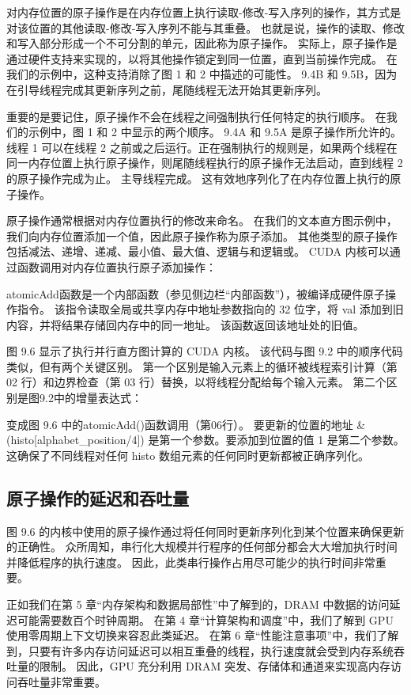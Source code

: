 对内存位置的原子操作是在内存位置上执行读取-修改-写入序列的操作，其方式是对该位置的其他读取-修改-写入序列不能与其重叠。 也就是说，操作的读取、修改和写入部分形成一个不可分割的单元，因此称为原子操作。 实际上，原子操作是通过硬件支持来实现的，以将其他操作锁定到同一位置，直到当前操作完成。 在我们的示例中，这种支持消除了图 1 和 2 中描述的可能性。 9.4B 和 9.5B，因为在引导线程完成其更新序列之前，尾随线程无法开始其更新序列。

重要的是要记住，原子操作不会在线程之间强制执行任何特定的执行顺序。 在我们的示例中，图 1 和 2 中显示的两个顺序。 9.4A 和 9.5A 是原子操作所允许的。 线程 1 可以在线程 2 之前或之后运行。正在强制执行的规则是，如果两个线程在同一内存位置上执行原子操作，则尾随线程执行的原子操作无法启动，直到线程 2 的原子操作完成为止。 主导线程完成。 这有效地序列化了在内存位置上执行的原子操作。

原子操作通常根据对内存位置执行的修改来命名。 在我们的文本直方图示例中，我们向内存位置添加一个值，因此原子操作称为原子添加。 其他类型的原子操作包括减法、递增、递减、最小值、最大值、逻辑与和逻辑或。 CUDA 内核可以通过函数调用对内存位置执行原子添加操作：

atomicAdd函数是一个内部函数（参见侧边栏“内部函数”），被编译成硬件原子操作指令。 该指令读取全局或共享内存中地址参数指向的 32 位字，将 val 添加到旧内容，并将结果存储回内存中的同一地址。 该函数返回该地址处的旧值。

图 9.6 显示了执行并行直方图计算的 CUDA 内核。 该代码与图 9.2 中的顺序代码类似，但有两个关键区别。 第一个区别是输入元素上的循环被线程索引计算（第 02 行）和边界检查（第 03 行）替换，以将线程分配给每个输入元素。 第二个区别是图9.2中的增量表达式：

变成图 9.6 中的atomicAdd()函数调用（第06行）。 要更新的位置的地址 \&(histo[alphabet\_position/4]) 是第一个参数。要添加到位置的值 1 是第二个参数。 这确保了不同线程对任何 histo 数组元素的任何同时更新都被正确序列化。

\subsection{原子操作的延迟和吞吐量}
图 9.6 的内核中使用的原子操作通过将任何同时更新序列化到某个位置来确保更新的正确性。 众所周知，串行化大规模并行程序的任何部分都会大大增加执行时间并降低程序的执行速度。 因此，此类串行操作占用尽可能少的执行时间非常重要。

正如我们在第 5 章“内存架构和数据局部性”中了解到的，DRAM 中数据的访问延迟可能需要数百个时钟周期。 在第 4 章“计算架构和调度”中，我们了解到 GPU 使用零周期上下文切换来容忍此类延迟。 在第 6 章“性能注意事项”中，我们了解到，只要有许多内存访问延迟可以相互重叠的线程，执行速度就会受到内存系统吞吐量的限制。 因此，GPU 充分利用 DRAM 突发、存储体和通道来实现高内存访问吞吐量非常重要。

